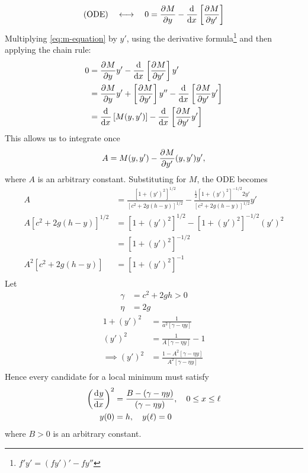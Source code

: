 \documentclass[12pt,twoside]{article}
\begin{document}
\begin{equation}
  \label{eq:m-equation}
  \text{(ODE)}\quad\longleftrightarrow \quad 0=\frac{\partial^{} {M}}{\partial {y}^{}}- \frac{\mathrm{d}^{} {}}{\mathrm{d}{x}^{}}\left[ \frac{\partial^{} {M}}{\partial {y'}^{}} \right]
\end{equation}
Multiplying \cref{eq:m-equation} by $y'$, using the derivative
formula\footnote{$f'y'=(fy')'-fy''$} and then applying the chain rule:
\begin{align*}
  0 &= \frac{\partial^{} {M}}{\partial {y}^{}} y' - \frac{\mathrm{d}^{} {}}{\mathrm{d}{x}^{}}\left[ \frac{\partial^{} {M}}{\partial {y'}^{}} \right]y' \\
    &= \frac{\partial^{} {M}}{\partial {y}^{}}y' + \left[ \frac{\partial^{} {M}}{\partial {y'}^{}} \right]y'' - \frac{\mathrm{d}^{} {}}{\mathrm{d}{x}^{}}\left[ \frac{\partial^{} {M}}{\partial {y'}^{}}y' \right] \\
    &= \frac{\mathrm{d}^{} {}}{\mathrm{d}{x}^{}}\left[ M(y,y') \right] - \frac{\mathrm{d}^{} {}}{\mathrm{d}{x}^{}}\left[ \frac{\partial^{} {M}}{\partial {y'}^{}}y' \right]
\end{align*}
This allows us to integrate once
\begin{equation*}
  A = M(y,y')-\frac{\partial^{} {M}}{\partial {y'}^{}}(y,y')y',
\end{equation*}
where $A$ is an arbitrary constant. Substituting for $M$, the ODE becomes
\begin{align*}
  A
  &= \frac{{\left[ 1+{(y')}^2 \right]}^{1/2}}{{\left[ c^2+2g(h-y) \right]}^{1/2}} -
    \frac{\frac{1}{2}{\left[ 1+{(y')}^2 \right]}^{-1/2}2y'}{{\left[ c^2+2g(h-y) \right]}^{1/2}}y' \\
  A{{\left[ c^2+2g(h-y) \right]}^{1/2}}
  &= {\left[ 1+{(y')}^2 \right]}^{1/2} -
    {\left[ 1+{(y')}^2 \right]}^{-1/2}{(y')}^2 \\
  &= {\left[ 1+ {(y')}^2 \right]}^{-1/2} \\
  A^2{\left[ c^2+2g(h-y) \right]}
  &= {\left[ 1+ {(y')}^2 \right]}^{-1} \\
\end{align*}
Let
\begin{align*}
  \gamma &= c^2+2gh > 0 \\
  \eta &= 2g
\end{align*}
\begin{align*}
  1 + {(y')}^2 &= \frac{1}{a^2[\gamma-\eta y]} \\
  {(y')}^2 &= \frac{1}{A[\gamma-\eta y]}-1 \\
  \implies {(y')}^2 &= \frac{1-A^2[\gamma-\eta y]}{A^2[\gamma-\eta y]} \\
\end{align*}
Hence every candidate for a local minimum must satisfy
\begin{align*}
  {\left( \ensuremath{\frac{\mathrm{d}^{} {y}}{\mathrm{d}{x}^{}}} \right)}^2 &= \frac{B-(\gamma-\eta y)}{(\gamma-\eta y)},\quad 0\le x \le \ell \\
  y(0)&=h, \quad y(\ell)=0
\end{align*}
where $B>0$ is an arbitrary constant.
\end{document}
